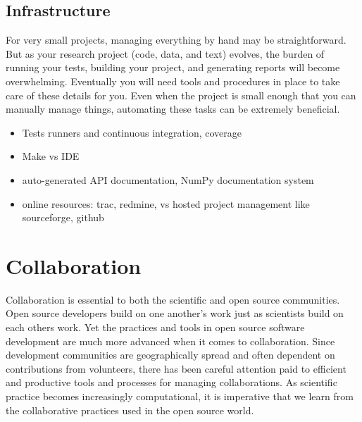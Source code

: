 \documentclass[ChapterTOCs,krantz2]{krantz} %
\theoremstyle{definition}
\begin{document}
\subsection{Infrastructure}

For very small projects, managing everything by hand may be straightforward.
But as your research project (code, data, and text) evolves, the burden of
running your tests, building your project, and generating reports will become
overwhelming. Eventually you will need tools and procedures in place to take
care of these details for you. Even when the project is small enough that you
can manually manage things, automating these tasks can be extremely beneficial.
\cite{doar2005practical}

\begin{itemize}

\item Tests runners and continuous integration, coverage

\item Make vs IDE

\item auto-generated API documentation, NumPy documentation system \cite{SciPyProceedings_27}

\item online resources: trac, redmine, vs hosted project management like
      sourceforge, github

\end{itemize}

\section{\label{sec:collaboration}Collaboration}

Collaboration is essential to both the scientific and open source communities.
Open source developers build on one another's work just as scientists build on
each others work.  Yet the practices and tools in open source software
development are much more advanced when it comes to collaboration. Since
development communities are geographically spread and often dependent on
contributions from volunteers, there has been careful attention paid to
efficient and productive tools and processes for managing collaborations.  As
scientific practice becomes increasingly computational, it is imperative that
we learn from the collaborative practices used in the open source world.
\end{document}
